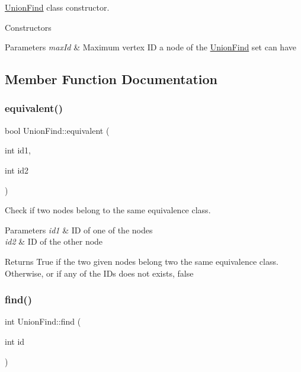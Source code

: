 \hyperlink{classUnionFind}{Union\+Find} class constructor. 

Constructors 
\begin{DoxyParams}{Parameters}
{\em max\+Id} & Maximum vertex ID a node of the \hyperlink{classUnionFind}{Union\+Find} set can have \\
\hline
\end{DoxyParams}


\subsection{Member Function Documentation}
\mbox{\label{classUnionFind_a1f5ed5a7c490e938d3f9a9abb6642e20}} 
\subsubsection{\texorpdfstring{equivalent()}{equivalent()}}
{\footnotesize\ttfamily bool Union\+Find\+::equivalent (\begin{DoxyParamCaption}\item[{int}]{id1,  }\item[{int}]{id2 }\end{DoxyParamCaption})}



Check if two nodes belong to the same equivalence class. 


\begin{DoxyParams}{Parameters}
{\em id1} & ID of one of the nodes \\
\hline
{\em id2} & ID of the other node \\
\hline
\end{DoxyParams}
\begin{DoxyReturn}{Returns}
True if the two given nodes belong two the same equivalence class. Otherwise, or if any of the I\+Ds does not exists, false 
\end{DoxyReturn}
\mbox{\label{classUnionFind_af3c7274809f59f8b734ded45c17d6830}} 
\subsubsection{\texorpdfstring{find()}{find()}}
{\footnotesize\ttfamily int Union\+Find\+::find (\begin{DoxyParamCaption}\item[{int}]{id }\end{DoxyParamCaption})}



